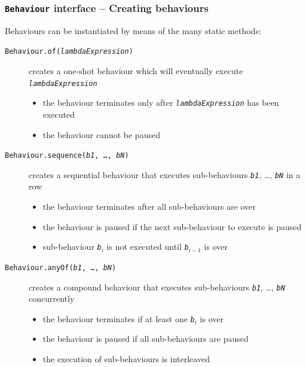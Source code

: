 \documentclass[presentation]{beamer}\mode<presentation>{\usetheme{AMSCesenaPurpleAndGold}}
\begin{document}
\begin{frame}[allowframebreaks]
    \frametitle{\texttt{Behaviour} interface -- Creating behaviours}

    Behaviours can be instantiated by means of the many \alert{static} methods:
    \bigskip
    \begin{description}
        \item[\texttt{{\small{}Behaviour.}of(\textit{lambdaExpression})}] creates a \alert{one-shot} behaviour which will eventually execute \texttt{\textit{lambdaExpression}}
        \begin{itemize}\small
            \item the behaviour terminates only after \texttt{\textit{lambdaExpression}} has been executed
            \item the behaviour cannot be paused
        \end{itemize}

        \bigskip

        \item[\texttt{{\small{}Behaviour.}sequence(\textit{b1}, \ldots, \textit{bN})}] creates a \alert{sequential} behaviour that executes sub-behaviours \texttt{\textit{b1}}, \ldots, \texttt{\textit{bN}} \alert{in a row}
        \begin{itemize}\small
            \item the behaviour terminates after \alert{all} sub-behaviours are over
            \item the behaviour is paused if the next sub-behaviour to execute is paused
            \item sub-behaviour \texttt{\textit{b$_i$}} is \alert{not} executed until \texttt{\textit{b$_{i-1}$}} is over
        \end{itemize}

        \bigskip

        \item[\texttt{{\small{}Behaviour.}anyOf(\textit{b1}, \ldots, \textit{bN})}] creates a compound behaviour that executes sub-behaviours \texttt{\textit{b1}}, \ldots, \texttt{\textit{bN}} \alert{concurrently}
        \begin{itemize}\small
            \item the behaviour terminates if \alert{at least} one \texttt{\textit{b$_i$}} is over
            \item the behaviour is paused if all sub-behaviours are paused
            \item the execution of sub-behaviours is interleaved
        \end{itemize}


\end{description}
\end{frame}
\end{document}
